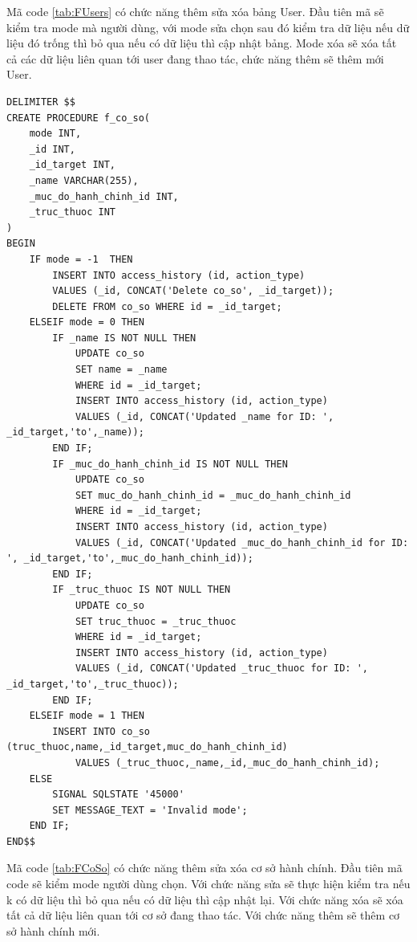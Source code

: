 \documentclass{article} %
\begin{document}
Mã code \ref{tab:FUsers} có chức năng thêm sửa xóa bảng User. Đầu tiên mã sẽ kiểm tra mode mà người dùng, với mode sửa chọn sau đó kiểm tra dữ liệu nếu dữ liệu đó trống thì bỏ qua nếu có dữ liệu thì cập nhật bảng. Mode xóa sẽ xóa tất cả các dữ liệu liên quan tới user đang thao tác, chức năng thêm sẽ thêm mới User.

\begin{lstlisting}[caption={FCoSo Creater Procedure Definition}, label={tab:FCoSo}]   
DELIMITER $$
CREATE PROCEDURE f_co_so(
    mode INT,
    _id INT, 
    _id_target INT,
    _name VARCHAR(255),               
    _muc_do_hanh_chinh_id INT,  
    _truc_thuoc INT
)
BEGIN
    IF mode = -1  THEN	
		INSERT INTO access_history (id, action_type)
		VALUES (_id, CONCAT('Delete co_so', _id_target));
        DELETE FROM co_so WHERE id = _id_target;
    ELSEIF mode = 0 THEN
        IF _name IS NOT NULL THEN
            UPDATE co_so 
            SET name = _name
            WHERE id = _id_target;
            INSERT INTO access_history (id, action_type)
            VALUES (_id, CONCAT('Updated _name for ID: ', _id_target,'to',_name));
        END IF;
        IF _muc_do_hanh_chinh_id IS NOT NULL THEN
            UPDATE co_so 
            SET muc_do_hanh_chinh_id = _muc_do_hanh_chinh_id
            WHERE id = _id_target;
            INSERT INTO access_history (id, action_type)
            VALUES (_id, CONCAT('Updated _muc_do_hanh_chinh_id for ID: ', _id_target,'to',_muc_do_hanh_chinh_id));
        END IF;
        IF _truc_thuoc IS NOT NULL THEN
            UPDATE co_so
            SET truc_thuoc = _truc_thuoc
            WHERE id = _id_target;
            INSERT INTO access_history (id, action_type)
            VALUES (_id, CONCAT('Updated _truc_thuoc for ID: ', _id_target,'to',_truc_thuoc));
        END IF;
    ELSEIF mode = 1 THEN
        INSERT INTO co_so (truc_thuoc,name,_id_target,muc_do_hanh_chinh_id)
			VALUES (_truc_thuoc,_name,_id,_muc_do_hanh_chinh_id);
	ELSE
        SIGNAL SQLSTATE '45000'
        SET MESSAGE_TEXT = 'Invalid mode';
    END IF;
END$$
\end{lstlisting}

Mã code \ref{tab:FCoSo} có chức năng thêm sửa xóa cơ sở hành chính. Đầu tiên mã code sẽ kiểm mode người dùng chọn. Với chức năng sửa sẽ thực hiện kiểm tra nếu k có dữ liệu thì bỏ qua nếu có dữ liệu thì cập nhật lại. Với chức năng xóa sẽ xóa tất cả dữ liệu liên quan tới cơ sở đang thao tác. Với chức năng thêm sẽ thêm cơ sở hành chính mới.
\end{document}
